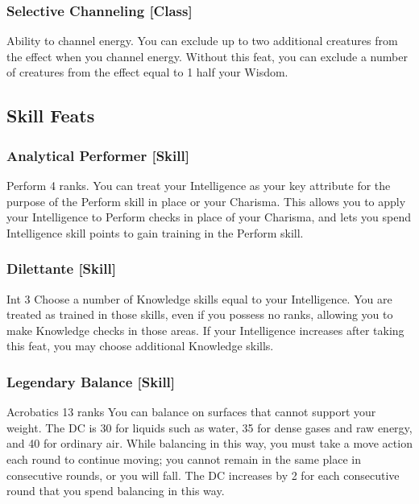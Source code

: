 \subsubsection{Selective Channeling [Class]}
 Ability to channel energy.
 You can exclude up to two additional creatures from the effect when you channel energy.
 Without this feat, you can exclude a number of creatures from the effect equal to 1 \add half your Wisdom.

\subsection{Skill Feats}

\subsubsection{Analytical Performer [Skill]}
\featpre Perform 4 ranks.
\featben You can treat your Intelligence as your key attribute for the purpose of the Perform skill in place or your Charisma. This allows you to apply your Intelligence to Perform checks in place of your Charisma, and lets you spend Intelligence skill points to gain training in the Perform skill.

\subsubsection{Dilettante [Skill]}
 Int 3
 Choose a number of Knowledge skills equal to your Intelligence. You are treated as trained in those skills, even if you possess no ranks, allowing you to make Knowledge checks in those areas. If your Intelligence increases after taking this feat, you may choose additional Knowledge skills.

\subsubsection{Legendary Balance [Skill]}
\featpre Acrobatics 13 ranks
\featben You can balance on surfaces that cannot support your weight. The DC is 30 for liquids such as water, 35 for dense gases and raw energy, and 40 for ordinary air. While balancing in this way, you must take a move action each round to continue moving; you cannot remain in the same place in consecutive rounds, or you will fall. The DC increases by 2 for each consecutive round that you spend balancing in this way.

